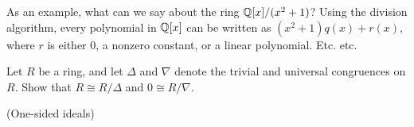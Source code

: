 As an example, what can we say about the ring \(\mathbb{Q}[x]/(x^2 + 1)\)?
Using the division algorithm, every polynomial in \(\mathbb{Q}[x]\) can be written as \((x^2+1)q(x) + r(x)\), where \(r\) is either 0, a nonzero constant, or a linear polynomial. Etc. etc.



\Exercises%

\begin{exercise}
Let \(R\) be a ring, and let \(\Delta\) and \(\nabla\) denote the trivial and universal congruences on \(R\).
Show that \(R \cong R/\Delta\) and \(0 \cong R/\nabla\).
\end{exercise}


\begin{exercise}
(One-sided ideals)
\end{exercise}
